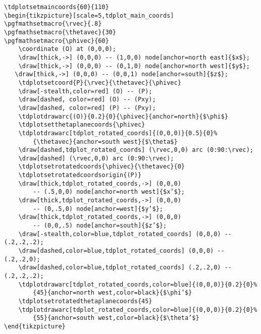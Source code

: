 \newpage

\begin{verbatim}
\tdplotsetmaincoords{60}{110}
\begin{tikzpicture}[scale=5,tdplot_main_coords]
\pgfmathsetmacro{\rvec}{.8}
\pgfmathsetmacro{\thetavec}{30}
\pgfmathsetmacro{\phivec}{60}
    \coordinate (O) at (0,0,0);
    \draw[thick,->] (0,0,0) -- (1,0,0) node[anchor=north east]{$x$};
    \draw[thick,->] (0,0,0) -- (0,1,0) node[anchor=north west]{$y$};
   \draw[thick,->] (0,0,0) -- (0,0,1) node[anchor=south]{$z$};
    \tdplotsetcoord{P}{\rvec}{\thetavec}{\phivec}
    \draw[-stealth,color=red] (O) -- (P);
    \draw[dashed, color=red] (O) -- (Pxy);
    \draw[dashed, color=red] (P) -- (Pxy);
    \tdplotdrawarc{(O)}{0.2}{0}{\phivec}{anchor=north}{$\phi$}
    \tdplotsetthetaplanecoords{\phivec}
    \tdplotdrawarc[tdplot_rotated_coords]{(0,0,0)}{0.5}{0}%
        {\thetavec}{anchor=south west}{$\theta$}
    \draw[dashed,tdplot_rotated_coords] (\rvec,0,0) arc (0:90:\rvec);
    \draw[dashed] (\rvec,0,0) arc (0:90:\rvec);
    \tdplotsetrotatedcoords{\phivec}{\thetavec}{0}
    \tdplotsetrotatedcoordsorigin{(P)}
    \draw[thick,tdplot_rotated_coords,->] (0,0,0)
        -- (.5,0,0) node[anchor=north west]{$x’$};
    \draw[thick,tdplot_rotated_coords,->] (0,0,0)
        -- (0,.5,0) node[anchor=west]{$y’$};
    \draw[thick,tdplot_rotated_coords,->] (0,0,0)
        -- (0,0,.5) node[anchor=south]{$z’$};
    \draw[-stealth,color=blue,tdplot_rotated_coords] (0,0,0) -- (.2,.2,.2);
    \draw[dashed,color=blue,tdplot_rotated_coords] (0,0,0) -- (.2,.2,0);
    \draw[dashed,color=blue,tdplot_rotated_coords] (.2,.2,0) -- (.2,.2,.2);
    \tdplotdrawarc[tdplot_rotated_coords,color=blue]{(0,0,0)}{0.2}{0}%
        {45}{anchor=north west,color=black}{$\phi’$}
    \tdplotsetrotatedthetaplanecoords{45}
    \tdplotdrawarc[tdplot_rotated_coords,color=blue]{(0,0,0)}{0.2}{0}%
        {55}{anchor=south west,color=black}{$\theta’$}
\end{tikzpicture}
\end{verbatim}

